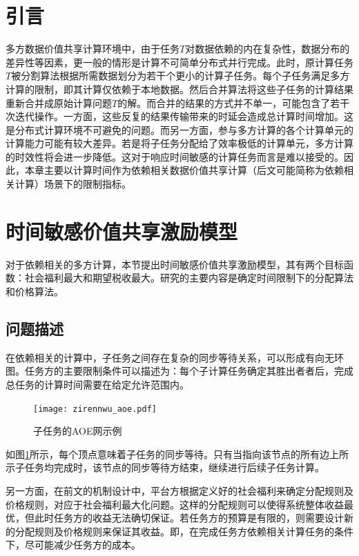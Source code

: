 \documentclass[promaster]{thesis-uestc}
\begin{document}
\section{引言}
多方数据价值共享计算环境中，由于任务$T$对数据依赖的内在复杂性，数据分布的差异性等因素，更一般的情形是计算不可简单分布式并行完成。此时，原计算任务$T$被分割算法根据所需数据划分为若干个更小的计算子任务。每个子任务满足多方计算的限制，即其计算仅依赖于本地数据。然后合并算法将这些子任务的计算结果重新合并成原始计算问题$T$的解。而合并的结果的方式并不单一，可能包含了若干次迭代操作。一方面，这些反复的结果传输带来的时延会造成总计算时间增加。这是分布式计算环境不可避免的问题。而另一方面，参与多方计算的各个计算单元的计算能力可能有较大差异。若是将子任务分配给了效率极低的计算单元，多方计算的时效性将会进一步降低。这对于响应时间敏感的计算任务而言是难以接受的。因此，本章主要以计算时间作为依赖相关数据价值共享计算（后文可能简称为依赖相关计算）场景下的限制指标。

\section{时间敏感价值共享激励模型}
对于依赖相关的多方计算，本节提出时间敏感价值共享激励模型，其有两个目标函数：社会福利最大和期望税收最大。研究的主要内容是确定时间限制下的分配算法和价格算法。

\subsection{问题描述}
在依赖相关的计算中，子任务之间存在复杂的同步等待关系，可以形成有向无环图。任务方的主要限制条件可以描述为：每个子计算任务确定其胜出者者后，完成总任务的计算时间需要在给定允许范围内。

\begin{figure}[h]
\texttt{[image: zirennwu\_aoe.pdf]}
\caption{子任务的AOE网示例}
\label{zirennwu_aoe}
\end{figure}

如图\ref{zirennwu_aoe}所示，每个顶点意味着子任务的同步等待。只有当指向该节点的所有边上所示子任务均完成时，该节点的同步等待方结束，继续进行后续子任务计算。

另一方面，在前文的机制设计中，平台方根据定义好的社会福利来确定分配规则及价格规则，对应于社会福利最大化问题。这样的分配规则可以使得系统整体收益最优，但此时任务方的收益无法确切保证。若任务方的预算是有限的，则需要设计新的分配规则及价格规则来保证其收益。即，在完成任务方依赖相关计算任务的条件下，尽可能减少任务方的成本。

\FloatBarrier
\end{document}
